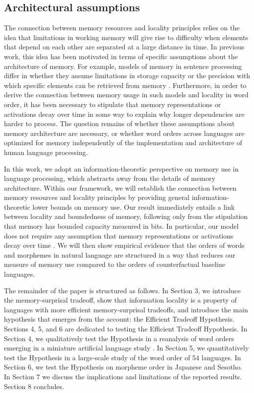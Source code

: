 \subsection{Architectural assumptions}

The connection between memory resources and locality principles relies on the idea that limitations in working memory will give rise to difficulty when elements that depend on each other are separated at a large distance in time. In previous work, this idea has been motivated in terms of specific assumptions about the architecture of memory. For example, models of memory in sentence processing differ in whether they assume limitations in storage capacity \citep[e.g., `memory cost' in the model of][]{gibson1998linguistic} or the precision with which specific elements can be retrieved from memory \citep[e.g.][]{lewis-activation-based-2005}. Furthermore, in order to derive the connection between memory usage in such models and locality in word order, it has been necessary to stipulate that memory representations or activations decay over time in some way to explain why longer dependencies are harder to process.
The question remains of whether these assumptions about memory architecture are necessary, or whether word orders across languages are optimized for memory independently of the implementation and architecture of human language processing.

In this work, we adopt an information-theoretic perspective on memory use in language processing, which abstracts away from the details of memory architecture. 
Within our framework, we will establish the connection between memory resources and locality principles by providing general information-theoretic lower bounds on memory use.
Our result immediately entails a link between locality and boundedness of memory, following only from the stipulation that memory has bounded capacity measured in bits. 
In particular, our model does not require any assumption that memory representations or activations decay over time \citep[as was required in][]{gibson1998linguistic, lewis-activation-based-2005, futrell2020lossy}.
We will then show empirical evidence that the orders of words and morphemes in natural language are structured in a way that reduces our measure of memory use compared to the orders of counterfactual baseline languages.

The remainder of the paper is structured as follows. In Section 3, we introduce the memory-surprisal tradeoff, show that information locality is a property of languages with more efficient memory-surprisal tradeoffs, and introduce the main hypothesis that emerges from the account: the Efficient Tradeoff Hypothesis. Sections 4, 5, and 6 are dedicated to testing the Efficient Tradeoff Hypothesis. In Section 4, we qualitatively test the Hypothesis in a reanalysis of word orders emerging in a miniature artificial language study \citep{fedzechkina-human-2017}.
In Section 5, we quantitatively test the Hypothesis in a large-scale study of the word order of 54 languages. In Section 6, we test the Hypothesis on morpheme order in Japanese and Sesotho.
In Section 7 we discuss the implications and limitations of the reported results.
Section 8 concludes.


